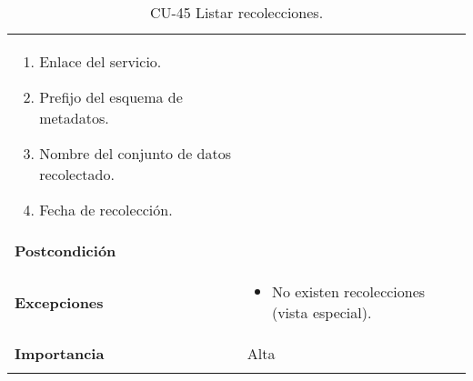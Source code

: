 \begin{longtable}[]{@{}ll@{}}
\begin{minipage}[t]{0.76\columnwidth}
\begin{enumerate}
  \begin{enumerate}
  \def\labelenumii{\alph{enumii}.}
  \tightlist
  \item
    Enlace del servicio.
  \item
    Prefijo del esquema de metadatos.
  \item
    Nombre del conjunto de datos recolectado.
  \item
    Fecha de recolección.
  \end{enumerate}
\end{enumerate}\strut
\end{minipage}\tabularnewline
\begin{minipage}[t]{0.19\columnwidth}\raggedright
\textbf{Postcondición}\strut
\end{minipage} & \begin{minipage}[t]{0.76\columnwidth}\raggedright
\strut
\end{minipage}\tabularnewline
\begin{minipage}[t]{0.19\columnwidth}\raggedright
\textbf{Excepciones}\strut
\end{minipage} & \begin{minipage}[t]{0.76\columnwidth}\raggedright
\begin{itemize}
\tightlist
\item
  No existen recolecciones (vista especial).
\end{itemize}\strut
\end{minipage}\tabularnewline
\begin{minipage}[t]{0.19\columnwidth}\raggedright
\textbf{Importancia}\strut
\end{minipage} & \begin{minipage}[t]{0.76\columnwidth}\raggedright
Alta\strut
\end{minipage}\tabularnewline
\bottomrule
\caption{CU-45 Listar recolecciones.} 
\end{longtable}

